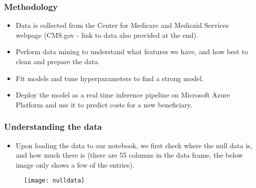 \documentclass{beamer}
\begin{document}

\begin{frame}

\frametitle{Methodology}

\begin{itemize}

\item Data is collected from the Center for Medicare and Medicaid Services webpage (CMS.gov - link to data also provided at the end). 

\item Perform data mining to understand what features we have, and how best to clean and prepare the data.

\item Fit models and tune hyperparameters to find a strong model.

\item Deploy the model as a real time inference pipeline on Microsoft Azure Platform and use it to predict costs for a new beneficiary.
\end{itemize}

\end{frame}



\begin{frame}

\frametitle{Understanding the data}

\begin{itemize}

\item Upon loading the data to our notebook, we first check where the null data is, and how much there is (there are 55 columns in the data frame, the below image only shows a few of the entries).



\end{itemize}

\begin{figure}
\texttt{[image: nulldata]}
\end{figure}

\end{frame}

\end{document}
